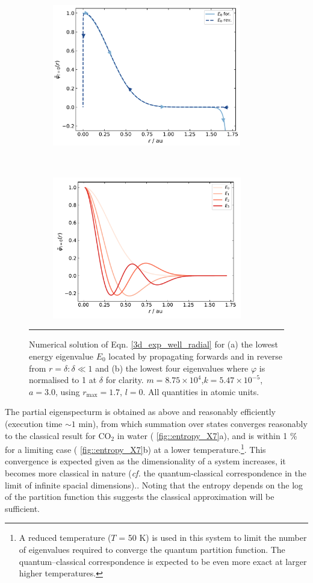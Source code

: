 \documentclass[../main.tex]{subfiles}
\begin{document}
\begin{figure}[h!]
	\begin{subfigure}[t]{0.5\textwidth}
		\centering
		\includegraphics[height=6.2cm]{4/figs/figX6/first_eigenfunction_lines.png}
		\caption{}
	\end{subfigure}%
	~ 
	\begin{subfigure}[t]{0.5\textwidth}
		\centering
		\includegraphics[height=6.2cm]{4/figs/figX6/eigenfunctions.pdf}
		\caption{}
	\end{subfigure}
	\vspace{0.2cm}
	\hrule
	\caption{Numerical solution of Eqn. \eqref{3d_exp_well_radial} for (a) the lowest energy eigenvalue $E_0$ located by propagating forwards and in reverse from $r = \delta : \delta \ll 1$ and (b) the lowest four eigenvalues where $\varphi$ is normalised to 1 at $\delta$ for clarity. $m =8.75 \times 10^4$,$k = 5.47 \times 10^{-5}$, $a = 3.0$, using $r_\text{max} = 1.7$, $l = 0$. All quantities in atomic units.} 
	\label{fig::entropy_X6}
\end{figure}

The partial eigenspecturm is obtained as above and reasonably efficiently (execution time $\sim1$ min), from which summation over states converges reasonably to the classical result for CO$_2$ in water (\figurename{ \ref{fig::entropy_X7}a}), and is within 1 \% for a limiting case (\figurename{ \ref{fig::entropy_X7}b}) at a lower temperature.\footnote{A reduced temperature ($T$ = 50 K) is used in this system to limit the number of  eigenvalues required to converge the quantum partition function. The quantum--classical correspondence is expected to be even more exact at larger higher temperatures.}. This convergence is expected given as the dimensionality of a system increases, it becomes more classical in nature (\emph{cf.} the quantum-classical correspondence in the limit of infinite spacial dimensions).\cite{QuantClassCorrespondence}. Noting that the entropy depends on the log of the partition function this suggests the classical approximation will be sufficient.
\end{document}
